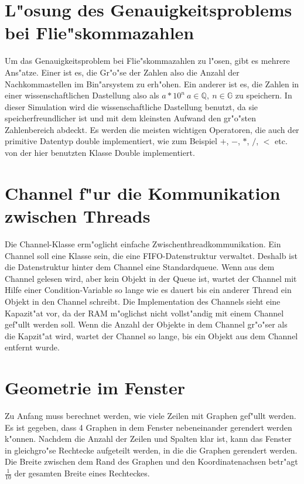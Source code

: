 \documentclass[14pt, a4paper]{report}
\begin{document}
\section{L"osung des Genauigkeitsproblems bei Flie"skommazahlen}
Um das Genauigkeitsproblem bei Flie"skommazahlen zu l"osen, gibt es mehrere Ans"atze.
Einer ist es, die Gr"o"se der Zahlen also die Anzahl der Nachkommastellen im
Bin"arsystem zu erh"ohen. Ein anderer ist es, die Zahlen in einer wissenschaftlichen
Dastellung also als $a * 10^n ~ a \in \mathbb Q, ~ n \in \mathbb G$ zu speichern. In
dieser Simulation wird die wissenschaftliche Dastellung benutzt, da sie 
speicherfreundlicher ist und mit dem kleinsten Aufwand den gr"o"sten Zahlenbereich
abdeckt. Es werden die meisten wichtigen Operatoren, die auch der primitive Datentyp double 
implementiert, wie zum Beispiel $+$, $-$, $*$, $/$, $<$ etc. von der hier benutzten Klasse Double
implementiert.

\section{Channel f"ur die Kommunikation zwischen Threads}
Die Channel-Klasse erm"oglicht einfache Zwischenthreadkommunikation. Ein Channel soll
eine Klasse sein, die eine FIFO-Datenstruktur verwaltet. Deshalb ist die Datenstruktur
hinter dem Channel eine Standardqueue. Wenn aus dem Channel gelesen wird, aber kein 
Objekt in der Queue ist, wartet der Channel mit Hilfe einer Condition-Variable so lange 
wie es dauert bis ein anderer
Thread ein Objekt in den Channel schreibt. Die Implementation des Channels sieht
eine Kapazit"at vor, da der RAM m"oglichst nicht vollst"andig mit einem Channel
gef"ullt werden soll.
Wenn die Anzahl der Objekte in dem Channel gr"o"ser als die Kapzit"at wird, wartet der 
Channel so lange, bis ein Objekt aus dem Channel entfernt wurde.

\section{Geometrie im Fenster}
Zu Anfang muss berechnet werden, wie viele Zeilen mit Graphen gef"ullt werden. Es ist
gegeben, dass 4 Graphen in dem Fenster nebeneinander gerendert werden k"onnen. 
Nachdem die 
Anzahl der Zeilen und Spalten klar ist, kann das Fenster in gleichgro"se Rechtecke
aufgeteilt werden, in die die Graphen gerendert werden. Die Breite zwischen dem Rand des 
Graphen und den Koordinatenachsen betr"agt $\frac{1}{10}$ der gesamten Breite eines
Rechteckes.
\end{document}
